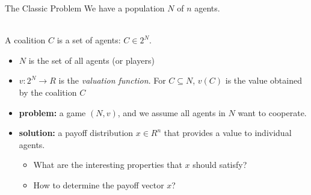 \documentclass{beamer}
\begin{document}
\begin{frame}{The Classic Problem}
    We have a population $N$ of $n$ agents.
    \begin{definition} [Coalition]~\\
       A coalition $C$ is a set of agents: $C \in 2^N$.
        \begin{itemize}
            \item $N$ is the set of all agents (or players)
            \item $v:2^N \rightarrow R$ is the \emph{valuation function}. For $C \subseteq N$, $v(C)$ is the value obtained by the coalition $C$
        \end{itemize}
    \end{definition}

    \begin{itemize}
        \item \textbf{problem:} a game $(N,v)$, and we assume all agents in $N$ want to cooperate.
        \item \textbf{solution:} a payoff distribution $x \in R^n$ that provides a value to individual agents.

        \begin{itemize}
            \item What are the interesting properties that $x$ should satisfy?
            \item How to determine the payoff vector $x$?
        \end{itemize}

    \end{itemize}
\end{frame}
\end{document}
